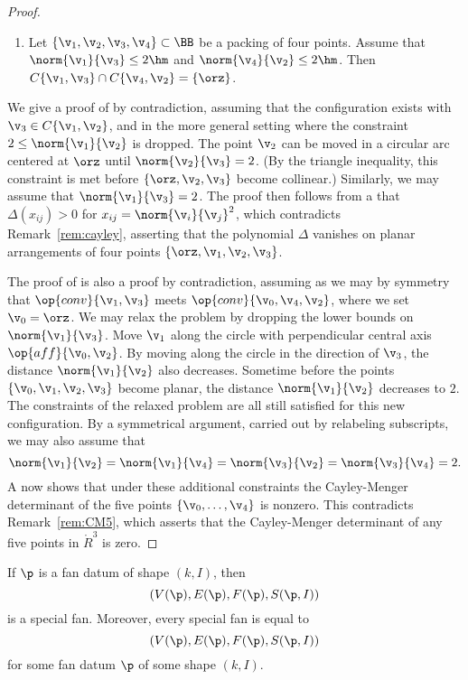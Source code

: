 \begin{proof}
\begin{enumerate}
  Then $\v_3\not\in C\{\v_1,\v_2\}$.
\item {} Let $\{\v_1,\v_2,\v_3,\v_4\}\subset \BB$ be a
  packing of four points.  Assume that $\norm{\v_1}{\v_3}\le 2\hm$ and
  $\norm{\v_4}{\v_2}\le 2\hm$.  Then $C\{\v_1,\v_3\}\cap
  C\{\v_4,\v_2\} = \{\orz\}$.
\end{enumerate}
We give a proof of  by contradiction, assuming that
the configuration exists with $\v_3\in C\{\v_1,\v_2\}$, and in the
more general setting where the constraint $2\le \norm{\v_1}{\v_2}$ is
dropped.  The point $\v_2$ can be moved in a circular arc centered at
$\orz$ until $\norm{\v_2}{\v_3}=2$.  (By the triangle inequality, this
constraint is met before $\{\orz,\v_2,\v_3\}$ become collinear.)
Similarly, we may assume that $\norm{\v_1}{\v_3}=2$.  The proof then
follows from a  that $\Delta(x_{ij})>0$ for  
$x_{ij}=\norm{\v_i}{\v_j}^2$, which contradicts Remark~\ref{rem:cayley},
asserting that the polynomial $\Delta$ vanishes on planar arrangements of four
points $\{\orz,\v_1,\v_2,\v_3\}$.


The proof of  is also a proof by contradiction,
assuming as we may by symmetry that $\op{conv}\{\v_1,\v_3\}$ meets
$\op{conv}\{\v_0,\v_4,\v_2\}$, where we set $\v_0=\orz$.  We may relax
the problem by dropping the lower bounds on $\norm{\v_1}{\v_3}$.  Move
$\v_1$ along the circle with perpendicular central axis
$\op{aff}\{\v_0,\v_2\}$. By moving along the circle in the direction
of $\v_3$, the distance $\norm{\v_1}{\v_2}$ also decreases.  Sometime
before the points $\{\v_0,\v_1,\v_2,\v_3\}$ become planar, the
distance $\norm{\v_1}{\v_2}$ decreases to $2$.  The constraints of the
relaxed problem are all still satisfied for this new configuration.
By a symmetrical argument, carried out by relabeling subscripts, we
may also assume that
\[
\norm{\v_1}{\v_2}= \norm{\v_1}{\v_4}=\norm{\v_3}{\v_2}=\norm{\v_3}{\v_4}=2.
\]
A  
now shows that under these additional
constraints the Cayley-Menger determinant of the five points
$\{\v_0,\ldots,\v_4\}$ is nonzero.  This contradicts Remark~\ref{rem:CM5},
which asserts that the Cayley-Menger determinant of any five points in
$\ring{R}^3$ is zero.

\end{proof}

\begin{lemma}[]
If $\p$ is a fan datum of shape $(k,I)$, then
\[ 
(V(\p),E(\p),F(\p),S(\p,I))
\] 
is a special fan.  Moreover, every special fan is equal to
\[ 
(V(\p),E(\p),F(\p),S(\p,I))
\] 
for some fan datum $\p$ of some shape $(k,I)$.
\end{lemma}

